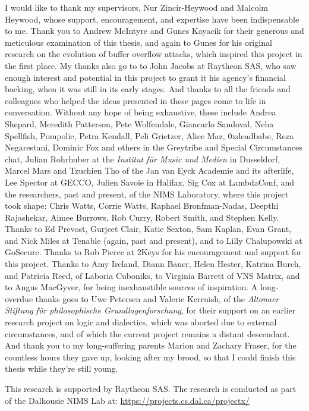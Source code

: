 \printnoidxglossaries
\clearpage
{}

\begin{acknowledgements}
I would like to thank my supervisors, Nur Zincir-Heywood and Malcolm Heywood,
whose support, encouragement, and expertise have been indispensable to me. Thank
you to Andrew McIntyre and Gunes Kayacik for their generous and meticulous
examination of this thesis, and again to Gunes for his original research on the
evolution of buffer overflow attacks, which inspired this project in the first
place. My thanks also go to to John Jacobs at Raytheon SAS, who saw enough
interest and potential in this project to grant it his agency's financial
backing, when it was still in its early stages. And thanks to all the friends
and colleagues who helped the ideas presented in these pages come to life in
conversation. Without any hope of being exhaustive, these include Andrea
Shepard, Meredith Patterson, Pete Wolfendale, Giancarlo Sandoval, Neha
Spellfish, Pompolic, Petra Kendall, Peli Grietzer, Alice Maz, 0xdeadbabe, Reza
Negarestani, Dominic Fox and others in the Greytribe and Special Circumstances
chat, Julian Rohrhuber at the \emph{Institut f\"ur Music und Medien} in
Dusseldorf, Marcel Mars and Tzuchien Tho of the Jan van Eyck Academie and its
afterlife, Lee Spector at GECCO, Julien Savoie in Halifax, Sig Cox at
LambdaConf, and the researchers, past and present, of the NIMS Laboratory, where
this project took shape: Chris Watts, Corrie Watts, Raphael Bronfman-Nadas,
Deepthi Rajashekar, Aimee Burrows, Rob Curry, Robert Smith, and Stephen Kelly.
Thanks to Ed Prevost, Gurjeet Clair, Katie Sexton, Sam Kaplan, Evan Grant, and
Nick Miles at Tenable (again, past and present), and to Lilly Chalupowski at
GoSecure. Thanks to Rob Pierce at 2Keys for his encouragement and support for
this project. Thanks to Amy Ireland, Diann Bauer, Helen Hester, Katrina Burch,
and Patricia Reed, of Laboria Cuboniks, to Virginia Barrett of VNS Matrix, and
to Angus MacGyver, for being inexhaustible sources of inspiration. A
long-overdue thanks goes to Uwe Petersen and Valerie Kerruish, of the
\emph{Altonaer Stiftung für philosophische Grundlagenforschung}, for their
support on an earlier research project on logic and dialectics, which was aborted due to
external circumstances, and of which the current project remains a distant
descendant. And thank you to my long-suffering parents Marion and Zachary
Fraser, for the countless hours they gave up, looking after my brood, so that I
could finish this thesis while they're still young.

This research is supported by Raytheon SAS. The research is conducted
as part of the Dalhousie NIMS Lab at: \url{https://projects.cs.dal.ca/projectx/}
\end{acknowledgements}

\clearpage
\mainmatter